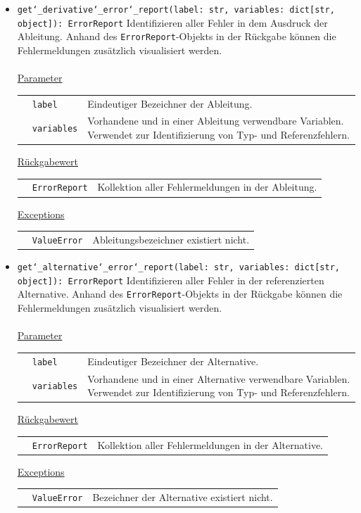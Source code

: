 \documentclass{article}
\begin{document}
\begin{itemize}
\item \texttt{get\char`_derivative\char`_error\char`_report(label: str, variables: dict[str, object]): ErrorReport} \newline Identifizieren aller Fehler in dem Ausdruck der Ableitung. Anhand des \texttt{ErrorReport}-Objekts in der Rückgabe können die Fehlermeldungen zusätzlich visualisiert werden.
\\\\
\underline{{Parameter}}

\begin{tabular}{lll}
 & \texttt{label} & Eindeutiger Bezeichner der Ableitung. \\
 & \texttt{variables} & Vorhandene und in einer Ableitung verwendbare Variablen. Verwendet zur Identifizierung von Typ- und Referenzfehlern. \\
\end{tabular}

\underline{{Rückgabewert}}

\begin{tabular}{lll}
 & \texttt{ErrorReport} & Kollektion aller Fehlermeldungen in der Ableitung. \\
\end{tabular}

\underline{Exceptions}\\
\begin{tabular}{lll}
 & \texttt{ValueError} & Ableitungsbezeichner existiert nicht.\\
\end{tabular}


\item \texttt{get\char`_alternative\char`_error\char`_report(label: str, variables: dict[str, object]): ErrorReport} \newline Identifizieren aller Fehler in der referenzierten Alternative. Anhand des \texttt{ErrorReport}-Objekts in der Rückgabe können die Fehlermeldungen zusätzlich visualisiert werden.
\\\\
\underline{{Parameter}}

\begin{tabular}{lll}
 & \texttt{label} & Eindeutiger Bezeichner der Alternative. \\
 & \texttt{variables} & Vorhandene und in einer Alternative verwendbare Variablen. Verwendet zur Identifizierung von Typ- und Referenzfehlern. \\
\end{tabular}

\underline{{Rückgabewert}}

\begin{tabular}{lll}
 & \texttt{ErrorReport} & Kollektion aller Fehlermeldungen in der Alternative. \\
\end{tabular}

\underline{Exceptions}\\
\begin{tabular}{lll}
 & \texttt{ValueError} & Bezeichner der Alternative existiert nicht.\\
\end{tabular}
\end{itemize}
\end{document}
